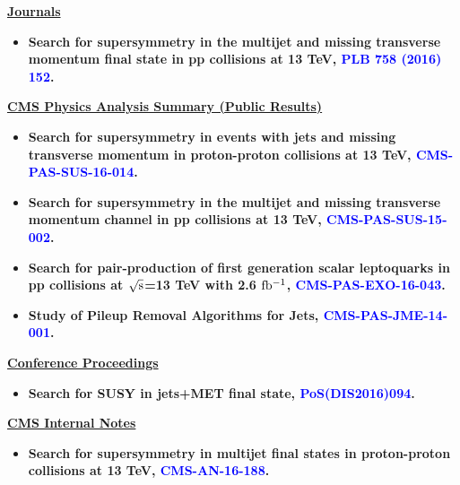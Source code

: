 \begin{titlepage}
\vspace{2cm}
\underline{\bf \Large{Journals}}

\begin{itemize}

\item {\bf  Search for supersymmetry in the multijet and missing transverse momentum final state in pp collisions at 13 TeV, \textcolor{blue}{PLB 758 (2016) 152}.}

\end{itemize}
\vspace{0.5cm}
\underline{\bf \Large{CMS Physics Analysis Summary (Public Results)}}

\begin{itemize}
\item {\bf Search for supersymmetry in events with jets and missing
transverse momentum in proton-proton collisions at 13 TeV, \textcolor{blue}{CMS-PAS-SUS-16-014}.}

\item{\bf Search for supersymmetry in the multijet and missing transverse momentum channel in pp collisions at 13 TeV, \textcolor{blue}{CMS-PAS-SUS-15-002}. }

\item{\bf Search for pair-production of first generation scalar leptoquarks in pp collisions at $\rm \sqrt{s}$=13 TeV with 2.6 $\rm fb^{-1}$, \textcolor{blue}{CMS-PAS-EXO-16-043}. }

\item{\bf Study of Pileup Removal Algorithms for Jets, \textcolor{blue}{CMS-PAS-JME-14-001}.}

\end{itemize}
\vspace{0.5cm}
\underline{\bf \Large{Conference Proceedings}}

\begin{itemize}

\item {\bf Search for SUSY in jets+MET final state, \textcolor{blue}{ PoS(DIS2016)094}.}

\end{itemize}
\vspace{0.5cm}
\underline{\bf \Large{CMS Internal Notes}}

\begin{itemize}

\item {\bf Search for supersymmetry in multijet final states in proton-proton collisions at 13 TeV, \textcolor{blue}{CMS-AN-16-188}.}


\end{itemize}
\end{titlepage}
